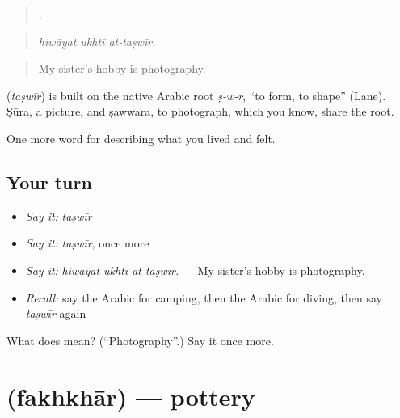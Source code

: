 \begin{quote}
  .
\end{quote}

\begin{quote}
\emph{hiwāyat ukhtī at-taṣwīr.}
\end{quote}

\begin{quote}
My sister's hobby is photography.
\end{quote}

\begin{cousinweb}
\textbf{} (\emph{taṣwīr}) is built on the native Arabic root \emph{ṣ-w-r}, \textquotedblleft{}to form, to shape\textquotedblright{} (Lane). Ṣūra, a picture, and ṣawwara, to photograph, which you know, share the root.
\end{cousinweb}

\begin{grammarlens}[title={What you've built}]
One more word for describing what you lived and felt.
\end{grammarlens}

\subsection*{Your turn}
\begin{itemize}
\raggedright
  \item \emph{Say it:} \emph{taṣwīr}
  \item \emph{Say it:} \emph{taṣwīr}, once more
  \item \emph{Say it:} \emph{hiwāyat ukhtī at-taṣwīr.} — My sister's hobby is photography.
  \item \emph{Recall:} say the Arabic for camping, then the Arabic for diving, then say \emph{taṣwīr} again
\end{itemize}

\begin{tcolorbox}[breakable,colback=teal!4,colframe=teal!35!black,title={Before you move on}]
What does  mean? (\textquotedblleft{}Photography\textquotedblright{}.) Say it once more.
\end{tcolorbox}
\section[\texorpdfstring{\ar{فخار} (fakhkhār)}{فخار (fakhkhār)}]{ (fakhkhār) — pottery}

\label{lesson:AR-C537-fakhkhar}



